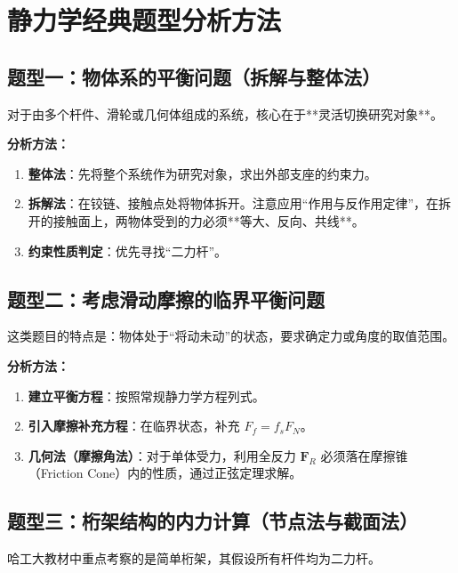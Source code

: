 \documentclass[12pt,a4paper]{article}
\newcommand{\vect}[1]{\mathbf{#1}}                   %
\begin{document}
\section{静力学经典题型分析方法}

\subsection{题型一：物体系的平衡问题（拆解与整体法）}
对于由多个杆件、滑轮或几何体组成的系统，核心在于**灵活切换研究对象**。

\textbf{分析方法：}
\begin{enumerate}
    \item \textbf{整体法}：先将整个系统作为研究对象，求出外部支座的约束力。
    \item \textbf{拆解法}：在铰链、接触点处将物体拆开。注意应用“作用与反作用定律”，在拆开的接触面上，两物体受到的力必须**等大、反向、共线**。
    \item \textbf{约束性质判定}：优先寻找“二力杆”。
\end{enumerate}



\subsection{题型二：考虑滑动摩擦的临界平衡问题}
这类题目的特点是：物体处于“将动未动”的状态，要求确定力或角度的取值范围。

\textbf{分析方法：}
\begin{enumerate}
    \item \textbf{建立平衡方程}：按照常规静力学方程列式。
    \item \textbf{引入摩擦补充方程}：在临界状态，补充 $F_f = f_s F_N$。
    \item \textbf{几何法（摩擦角法）}：对于单体受力，利用全反力 $\vect{F}_R$ 必须落在摩擦锥（Friction Cone）内的性质，通过正弦定理求解。
\end{enumerate}



\subsection{题型三：桁架结构的内力计算（节点法与截面法）}
哈工大教材中重点考察的是简单桁架，其假设所有杆件均为二力杆。
\end{document}
